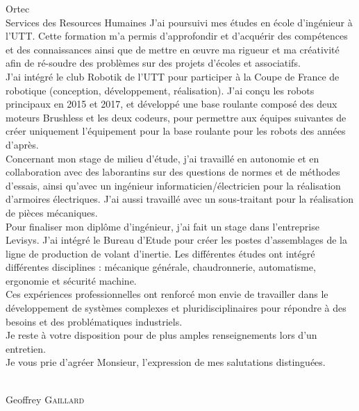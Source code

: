 \documentclass[a4paper,10pt,firstfoot=false]{scrlttr2}
\begin{document}
\begin{letter}{Ortec \\ Services des Resources Humaines}
J’ai poursuivi mes études en école d’ingénieur à l’UTT. Cette formation m’a permis d’approfondir et d’acquérir des compétences et des connaissances ainsi que de mettre en œuvre ma rigueur et ma créativité afin de ré-soudre des problèmes sur des projets d’écoles et associatifs.\\

J'ai intégré le club Robotik de l'UTT pour participer à la Coupe de France de robotique (conception, développement, réalisation). J'ai conçu les robots principaux en 2015 et 2017, et développé une base roulante composé des deux moteurs Brushless et les deux codeurs, pour permettre aux équipes suivantes de créer uniquement l'équipement pour la base roulante pour les robots des années d'après.\\

Concernant mon stage de milieu d’étude, j’ai travaillé en autonomie et en collaboration avec des laborantins sur des questions de normes et de méthodes d’essais, ainsi qu’avec un ingénieur informaticien/électricien pour la réalisation d’armoires électriques. J’ai aussi travaillé avec un sous-traitant pour la réalisation de pièces mécaniques.\\

Pour finaliser mon diplôme d'ingénieur, j'ai fait un stage dans l'entreprise Levisys. J'ai intégré le Bureau d'Etude pour créer les postes d'assemblages de la ligne de production de volant d'inertie. Les différentes études ont intégré différentes disciplines : mécanique générale, chaudronnerie, automatisme, ergonomie et sécurité machine.\\

Ces expériences professionnelles ont renforcé mon envie de travailler dans le développement de systèmes complexes et pluridisciplinaires pour répondre à des besoins et des problématiques industriels.\\

Je reste à votre disposition pour de plus amples renseignements lors d’un entretien.\\
Je vous prie d’agréer Monsieur, l’expression de mes salutations distinguées.

\begin{flushright}
\\[6ex] Geoffrey \textsc{Gaillard}
\end{flushright}

\end{letter}
\end{document}
